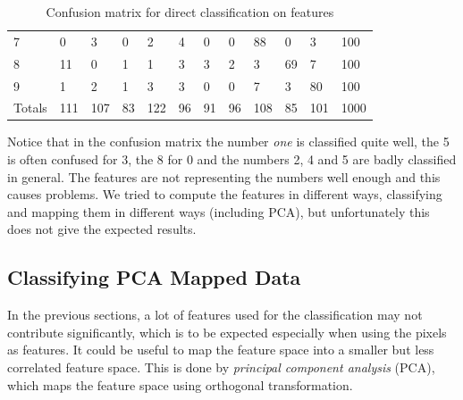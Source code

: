 \documentclass{article}
\begin{document}
\begin{table}[H]
\begin{tabular}{l|llllllllll|l|}
    7     & \multicolumn{1}{l}{0} & \multicolumn{1}{l}{3} & \multicolumn{1}{l}{0} & \multicolumn{1}{l}{2} & \multicolumn{1}{l}{4} & \multicolumn{1}{l}{0} & \multicolumn{1}{l}{0} & \multicolumn{1}{l}{88} & \multicolumn{1}{l}{0} & \multicolumn{1}{l}{3} & 100 \\
    8     & \multicolumn{1}{l}{11} & \multicolumn{1}{l}{0} & \multicolumn{1}{l}{1} & \multicolumn{1}{l}{1} & \multicolumn{1}{l}{3} & \multicolumn{1}{l}{3} & \multicolumn{1}{l}{2} & \multicolumn{1}{l}{3} & \multicolumn{1}{l}{69} & \multicolumn{1}{l}{7} & 100 \\
    9     & \multicolumn{1}{l}{1} & \multicolumn{1}{l}{2} & \multicolumn{1}{l}{1} & \multicolumn{1}{l}{3} & \multicolumn{1}{l}{3} & \multicolumn{1}{l}{0} & \multicolumn{1}{l}{0} & \multicolumn{1}{l}{7} & \multicolumn{1}{l}{3} & \multicolumn{1}{l}{80} & 100 \\ \hline
    Totals & \multicolumn{1}{l}{111} & \multicolumn{1}{l}{107} & \multicolumn{1}{l}{83} & \multicolumn{1}{l}{122} & \multicolumn{1}{l}{96} & \multicolumn{1}{l}{91} & \multicolumn{1}{l}{96} & \multicolumn{1}{l}{108} & \multicolumn{1}{l}{85} & \multicolumn{1}{l}{101} & 1000 \\
    \hline
    \end{tabular}%
  \label{table: confusion matrix on features}   \caption{Confusion matrix for direct classification on features}
\end{table}%

Notice that in the confusion matrix the number \emph{one} is classified quite well, the 5 is often confused for 3, the 8 for 0 and the numbers 2, 4 and 5 are badly classified in general. The features are not representing the numbers well enough and this causes problems. We tried to compute the features in different ways, classifying and mapping them in different ways (including PCA), but unfortunately this does not give the expected results. 

\subsection{Classifying PCA Mapped Data}
\label{sec: Classifying PCA mapped data}
In the previous sections, a lot of features used for the classification may not contribute significantly, which is to be expected especially when using the pixels as features. It could be useful to map the feature space into a smaller but less correlated feature space. This is done by \emph{principal component analysis} (PCA), which maps the feature space using orthogonal transformation. \\
\end{document}
